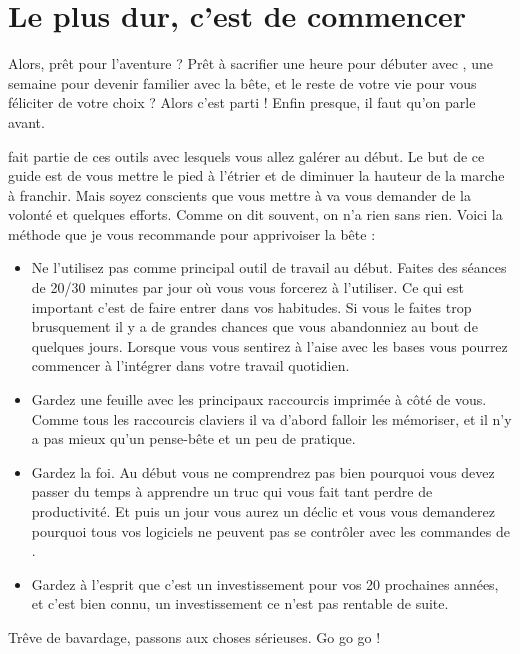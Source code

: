 \section{Le plus dur, c'est de commencer}

Alors, prêt pour l'aventure ? Prêt à sacrifier une heure pour débuter avec \vim, une semaine pour devenir familier avec la bête, et le reste de votre vie pour vous féliciter de votre choix ? Alors c'est parti ! Enfin presque, il faut qu'on parle avant.

\vim fait partie de ces outils avec lesquels vous allez galérer au début. Le but de ce guide est de vous mettre le pied à l'étrier et de diminuer la hauteur de la marche à franchir. Mais soyez conscients que vous mettre à \vim va vous demander de la volonté et quelques efforts. Comme on dit souvent, on n'a rien sans rien. Voici la méthode que je vous recommande pour apprivoiser la bête :

\begin{itemize}
    \item Ne l'utilisez pas comme principal outil de travail au début. Faites des séances de 20/30 minutes par jour où vous vous forcerez à l'utiliser. Ce qui est important c'est de faire entrer \vim dans vos habitudes. Si vous le faites trop brusquement il y a de grandes chances que vous abandonniez au bout de quelques jours. Lorsque vous vous sentirez à l'aise avec les bases vous pourrez commencer à l'intégrer dans votre travail quotidien.
    \item Gardez une feuille avec les principaux raccourcis imprimée à côté de vous. Comme tous les raccourcis claviers il va d'abord falloir les mémoriser, et il n'y a pas mieux qu'un pense-bête et un peu de pratique.
    \item Gardez la foi. Au début vous ne comprendrez pas bien pourquoi vous devez passer du temps à apprendre un truc qui vous fait tant perdre de productivité. Et puis un jour vous aurez un déclic et vous vous demanderez pourquoi tous vos logiciels ne peuvent pas se contrôler avec les commandes de \vim.
    \item Gardez à l'esprit que c'est un investissement pour vos 20 prochaines années, et c'est bien connu, un investissement ce n'est pas rentable de suite.
\end{itemize}

\bigskip

Trêve de bavardage, passons aux choses sérieuses. Go go go !
